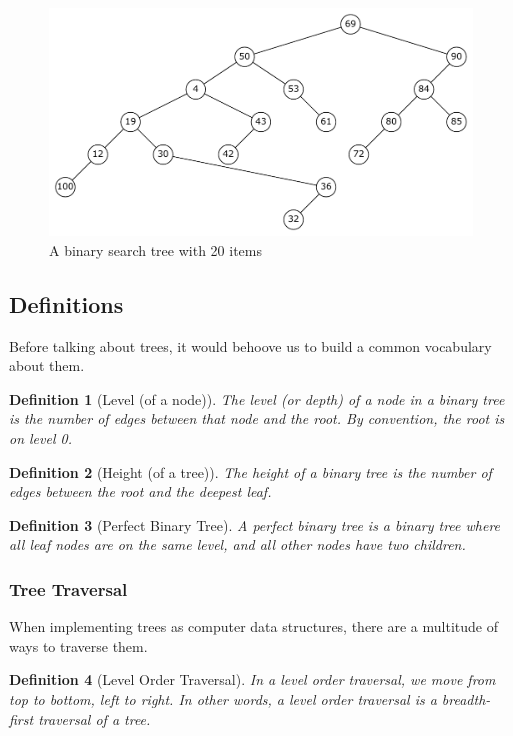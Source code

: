 \documentclass[11pt]{report}
\newtheorem{defn}{Definition}[section]
\begin{document}
\begin{figure}[H]
    \includegraphics[width=\linewidth]{report/bst_20.pdf}
    \caption{A binary search tree with 20 items}
\end{figure}

\subsection{Definitions}
Before talking about trees, it would behoove us to build a common vocabulary about them.

\begin{defn}[Level (of a node)]
    The level (or depth) of a node in a binary tree is the number of edges between that node and the root. By convention, the root is on level 0.
\end{defn}

\begin{defn}[Height (of a tree)]
    The height of a binary tree is the number of edges between the root and the deepest leaf.
\end{defn}

\begin{defn}[Perfect Binary Tree]
    A perfect binary tree is a binary tree where all leaf nodes are on the same level, and all other nodes have two children.
\end{defn}

\subsubsection{Tree Traversal}
When implementing trees as computer data structures, there are a multitude of ways to traverse them.

\begin{defn}[Level Order Traversal]
    In a level order traversal, we move from top to bottom, left to right. In other words, a level order traversal is a breadth-first traversal of a tree.
\end{defn}
\end{document}
